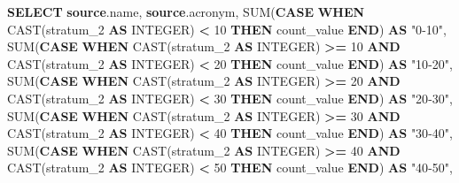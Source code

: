 \documentclass[
]{book}
\newenvironment{Shaded}{\begin{snugshade}}{\end{snugshade}}
\newcommand{\ControlFlowTok}[1]{\textcolor[rgb]{0.13,0.29,0.53}{\textbf{#1}}}
\newcommand{\DataTypeTok}[1]{\textcolor[rgb]{0.13,0.29,0.53}{#1}}
\newcommand{\DecValTok}[1]{\textcolor[rgb]{0.00,0.00,0.81}{#1}}
\newcommand{\FunctionTok}[1]{\textcolor[rgb]{0.00,0.00,0.00}{#1}}
\newcommand{\KeywordTok}[1]{\textcolor[rgb]{0.13,0.29,0.53}{\textbf{#1}}}
\newcommand{\NormalTok}[1]{#1}
\newcommand{\OperatorTok}[1]{\textcolor[rgb]{0.81,0.36,0.00}{\textbf{#1}}}
\newcommand{\OtherTok}[1]{\textcolor[rgb]{0.56,0.35,0.01}{#1}}
\begin{document}
\begin{Shaded}
\begin{Highlighting}[]
\KeywordTok{SELECT} \KeywordTok{source}\NormalTok{.name,}
       \KeywordTok{source}\NormalTok{.acronym,}
       \FunctionTok{SUM}\NormalTok{(}\ControlFlowTok{CASE} \ControlFlowTok{WHEN} \FunctionTok{CAST}\NormalTok{(stratum\_2 }\KeywordTok{AS} \DataTypeTok{INTEGER}\NormalTok{) }\OperatorTok{\textless{}} \DecValTok{10}
         \ControlFlowTok{THEN}\NormalTok{ count\_value }\ControlFlowTok{END}\NormalTok{) }\KeywordTok{AS} \OtherTok{"0{-}10"}\NormalTok{,}
       \FunctionTok{SUM}\NormalTok{(}\ControlFlowTok{CASE} \ControlFlowTok{WHEN} \FunctionTok{CAST}\NormalTok{(stratum\_2 }\KeywordTok{AS} \DataTypeTok{INTEGER}\NormalTok{) }\OperatorTok{\textgreater{}=} \DecValTok{10}
         \KeywordTok{AND} \FunctionTok{CAST}\NormalTok{(stratum\_2 }\KeywordTok{AS} \DataTypeTok{INTEGER}\NormalTok{) }\OperatorTok{\textless{}} \DecValTok{20}
         \ControlFlowTok{THEN}\NormalTok{ count\_value }\ControlFlowTok{END}\NormalTok{) }\KeywordTok{AS} \OtherTok{"10{-}20"}\NormalTok{,}
       \FunctionTok{SUM}\NormalTok{(}\ControlFlowTok{CASE} \ControlFlowTok{WHEN} \FunctionTok{CAST}\NormalTok{(stratum\_2 }\KeywordTok{AS} \DataTypeTok{INTEGER}\NormalTok{) }\OperatorTok{\textgreater{}=} \DecValTok{20}
         \KeywordTok{AND} \FunctionTok{CAST}\NormalTok{(stratum\_2 }\KeywordTok{AS} \DataTypeTok{INTEGER}\NormalTok{) }\OperatorTok{\textless{}} \DecValTok{30}
         \ControlFlowTok{THEN}\NormalTok{ count\_value }\ControlFlowTok{END}\NormalTok{) }\KeywordTok{AS} \OtherTok{"20{-}30"}\NormalTok{,}
       \FunctionTok{SUM}\NormalTok{(}\ControlFlowTok{CASE} \ControlFlowTok{WHEN} \FunctionTok{CAST}\NormalTok{(stratum\_2 }\KeywordTok{AS} \DataTypeTok{INTEGER}\NormalTok{) }\OperatorTok{\textgreater{}=} \DecValTok{30}
         \KeywordTok{AND} \FunctionTok{CAST}\NormalTok{(stratum\_2 }\KeywordTok{AS} \DataTypeTok{INTEGER}\NormalTok{) }\OperatorTok{\textless{}} \DecValTok{40}
         \ControlFlowTok{THEN}\NormalTok{ count\_value }\ControlFlowTok{END}\NormalTok{) }\KeywordTok{AS} \OtherTok{"30{-}40"}\NormalTok{,}
       \FunctionTok{SUM}\NormalTok{(}\ControlFlowTok{CASE} \ControlFlowTok{WHEN} \FunctionTok{CAST}\NormalTok{(stratum\_2 }\KeywordTok{AS} \DataTypeTok{INTEGER}\NormalTok{) }\OperatorTok{\textgreater{}=} \DecValTok{40}
         \KeywordTok{AND} \FunctionTok{CAST}\NormalTok{(stratum\_2 }\KeywordTok{AS} \DataTypeTok{INTEGER}\NormalTok{) }\OperatorTok{\textless{}} \DecValTok{50}
         \ControlFlowTok{THEN}\NormalTok{ count\_value }\ControlFlowTok{END}\NormalTok{) }\KeywordTok{AS} \OtherTok{"40{-}50"}\NormalTok{,}

\end{Highlighting}
\end{Shaded}
\end{document}
